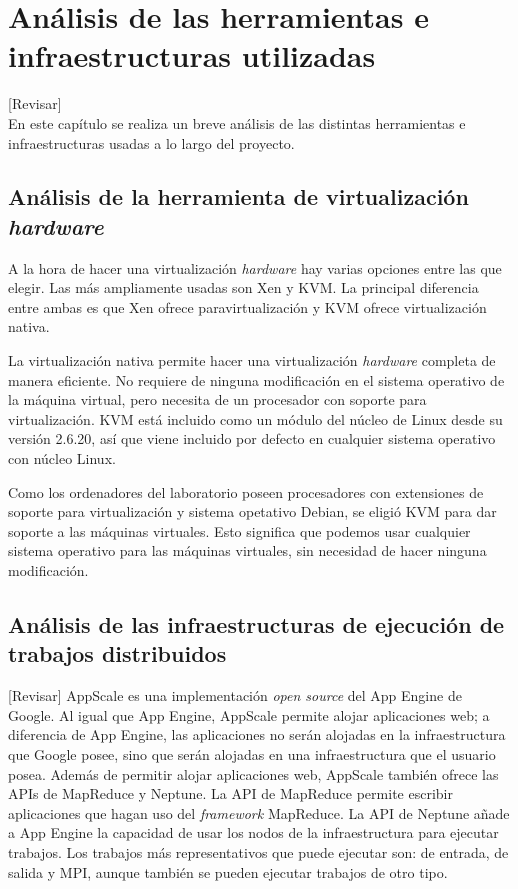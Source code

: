 \chapter{Análisis de las herramientas e infraestructuras utilizadas}
\label{cap:analisis}

[Revisar]\\

En este capítulo se realiza un breve análisis de las distintas herramientas e infraestructuras usadas a lo largo del proyecto.


\section{Análisis de la herramienta de virtualización \emph{hardware}}

A la hora de hacer una virtualización \emph{hardware} hay varias opciones entre las que elegir. Las más ampliamente usadas son Xen y KVM. La principal diferencia entre ambas es que Xen ofrece paravirtualización y KVM ofrece virtualización nativa.

La virtualización nativa permite hacer una virtualización \emph{hardware} completa de manera eficiente. No requiere de ninguna modificación en el sistema operativo de la máquina virtual, pero necesita de un procesador con soporte para virtualización. KVM está incluido como un módulo del núcleo de Linux desde su versión 2.6.20, así que viene incluido por defecto en cualquier sistema operativo con núcleo Linux.

Como los ordenadores del laboratorio poseen procesadores con extensiones de soporte para virtualización y sistema opetativo Debian, se eligió KVM para dar soporte a las máquinas virtuales. Esto significa que podemos usar cualquier sistema operativo para las máquinas virtuales, sin necesidad de hacer ninguna modificación.


\section{Análisis de las infraestructuras de ejecución de trabajos distribuidos}

[Revisar]
AppScale es una implementación \emph{open source} del App Engine de Google. Al igual que App Engine, AppScale permite alojar aplicaciones web; a diferencia de App Engine, las aplicaciones no serán alojadas en la infraestructura que Google posee, sino que serán alojadas en una infraestructura que el usuario posea. Además de permitir alojar aplicaciones web, AppScale también ofrece las APIs de MapReduce y Neptune. La API de MapReduce permite escribir aplicaciones que hagan uso del \emph{framework} MapReduce. La API de Neptune añade a App Engine la capacidad de usar los nodos de la infraestructura para ejecutar trabajos. Los trabajos más representativos que puede ejecutar son: de entrada, de salida y MPI, aunque también se pueden ejecutar trabajos de otro tipo.

